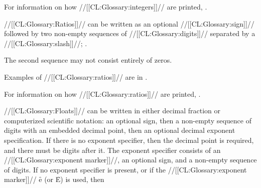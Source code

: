 For information on how //[[CL:Glossary:integers]]// are printed, \seesection\PrintingIntegers.

\endsubsubsubsection%


//[[CL:Glossary:Ratios]]// can be written as an optional //[[CL:Glossary:sign]]// followed by two
non-empty sequences of //[[CL:Glossary:digits]]// separated by a //[[CL:Glossary:slash]]//;
\seefigure\SyntaxForNumericTokens.

The second sequence may not consist
entirely of zeros.




Examples of //[[CL:Glossary:ratios]]// are in \thenextfigure.




For information on how //[[CL:Glossary:ratios]]// are printed,
\seesection\PrintingRatios.

\endsubsubsubsection%

\endsubsubsection%



//[[CL:Glossary:Floats]]// can be written in either decimal fraction or computerized
scientific notation: an optional sign, then a non-empty sequence of digits
with an embedded decimal point,
then an optional decimal exponent specification.
If there is no exponent specifier, then
the decimal point is required, and there must be digits
after it.
The exponent specifier consists of an //[[CL:Glossary:exponent marker]]//,
an optional sign, and a non-empty sequence of digits.
If no exponent specifier is present, or if the //[[CL:Glossary:exponent marker]]// \f{e}
(or \f{E}) is used, then



